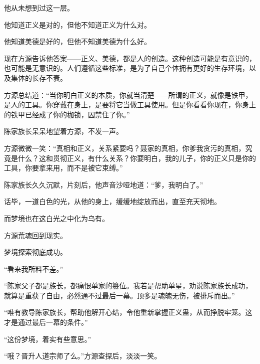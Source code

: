 \begin{this_body}
他从未想到过这一层。

他知道正义是对的，但他不知道正义为什么对。

他知道美德是好的，但他不知道美德为什么好。

现在方源告诉他答案——正义、美德，都是人的创造。这种创造可能是有意识的，也可能是无意识的。人们遵循这些标准，是为了自己个体拥有更好的生存环境，以及集体的长存不衰。

方源总结道：“当你明白正义的本质，你就当清楚——所谓的正义，就像是铁甲，是人的工具。你穿戴在身上，是要将它当做工具使用。但是你看看你现在，你身上的铁甲已经成了你的枷锁，囚禁住了你。”

陈家族长呆呆地望着方源，不发一声。

方源微微一笑：“真相和正义，关系紧要吗？聂家的真相，你爹我贪污的真相，究竟是什么？这和贯彻正义，有什么关系？你要明白，我的儿子，你的正义只是你的工具，你要拿来用，而不是被它束缚。”

陈家族长久久沉默，片刻后，他声音沙哑地道：“爹，我明白了。”

话毕，一道白色的光，从他的身上，缓缓地绽放而出，直至充天彻地。

而梦境也在这白光之中化为乌有。

方源荒魂回到现实。

梦境探索彻底成功。

“看来我所料不差。”

“陈家父子都是族长，都痛恨单家的篡位。我若是帮助单星，劝说陈家族长成功，就算是重获了自由，必然通不过最后一幕。顶多是魂魄无伤，被排斥而出。”

“唯有教导陈家族长，帮助他解开心结，令他重新掌握正义蛊，从而挣脱牢笼。这才是通过最后一幕的条件。”

“这份梦境，着实有些意思。”

“哦？晋升人道宗师了么。”方源查探后，淡淡一笑。

\end{this_body}


